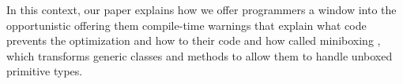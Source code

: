 In this context, our paper explains how we offer programmers a window into the opportunistic   offering them compile-time warnings that explain what code prevents the optimization and how to  their code and how called miniboxing \cite{miniboxing}, which transforms generic classes and methods to allow them to handle unboxed primitive types.








